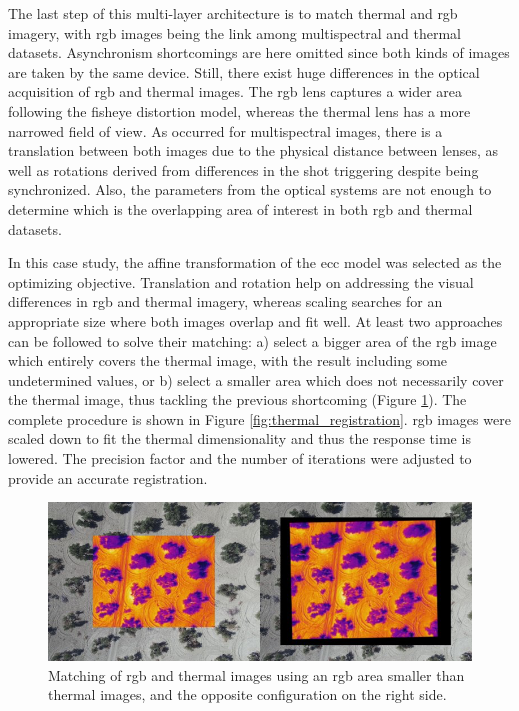 The last step of this multi-layer architecture is to match thermal and \acrshort{rgb} imagery, with \acrshort{rgb} images being the link among multispectral and thermal datasets. Asynchronism shortcomings are here omitted since both kinds of images are taken by the same device. Still, there exist huge differences in the optical acquisition of \acrshort{rgb} and thermal images. The \acrshort{rgb} lens captures a wider area following the fisheye distortion model, whereas the thermal lens has a more narrowed field of view. As occurred for multispectral images, there is a translation between both images due to the physical distance between lenses, as well as rotations derived from differences in the shot triggering despite being synchronized. Also, the parameters from the optical systems are not enough to determine which is the overlapping area of interest in both \acrshort{rgb} and thermal datasets. 

In this case study, the affine transformation of the \acrshort{ecc} model was selected as the optimizing objective. Translation and rotation help on addressing the visual differences in \acrshort{rgb} and thermal imagery, whereas scaling searches for an appropriate size where both images overlap and fit well. At least two approaches can be followed to solve their matching: a) select a bigger area of the \acrshort{rgb} image which entirely covers the thermal image, with the result including some undetermined values, or b) select a smaller area which does not necessarily cover the thermal image, thus tackling the previous shortcoming (Figure \ref{fig:thermal_comparative}). The complete procedure is shown in Figure \ref{fig:thermal_registration}. \acrshort{rgb} images were scaled down to fit the thermal dimensionality and thus the response time is lowered. The precision factor and the number of iterations were adjusted to provide an accurate registration. 

\begin{figure}
    \includegraphics{figs/image_fusion/thermal_comparative.png}
    \caption{Matching of \acrshort{rgb} and thermal images using an \acrshort{rgb} area smaller than thermal images, and the opposite configuration on the right side. }
    \label{fig:thermal_comparative}
\end{figure}

